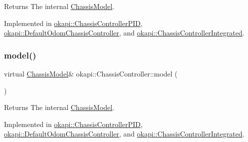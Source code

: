 \begin{DoxyReturn}{Returns}
The internal \mbox{\hyperlink{classokapi_1_1ChassisModel}{Chassis\+Model}}. 
\end{DoxyReturn}


Implemented in \mbox{\hyperlink{classokapi_1_1ChassisControllerPID_adffe6c9a65b6bd7664e0a884638d9097}{okapi\+::\+Chassis\+Controller\+P\+ID}}, \mbox{\hyperlink{classokapi_1_1DefaultOdomChassisController_a83e8bf7115086c331ada990ceb872bf1}{okapi\+::\+Default\+Odom\+Chassis\+Controller}}, and \mbox{\hyperlink{classokapi_1_1ChassisControllerIntegrated_a60c9a11616a2a41400c17952c36a5b57}{okapi\+::\+Chassis\+Controller\+Integrated}}.

\mbox{\label{classokapi_1_1ChassisController_a239802eda7e4317a65d1a04994f7b97e}} 
\subsubsection{\texorpdfstring{model()}{model()}}
{\footnotesize\ttfamily virtual \mbox{\hyperlink{classokapi_1_1ChassisModel}{Chassis\+Model}}\& okapi\+::\+Chassis\+Controller\+::model (\begin{DoxyParamCaption}{ }\end{DoxyParamCaption})\hspace{0.3cm}{\ttfamily [pure virtual]}}

\begin{DoxyReturn}{Returns}
The internal \mbox{\hyperlink{classokapi_1_1ChassisModel}{Chassis\+Model}}. 
\end{DoxyReturn}


Implemented in \mbox{\hyperlink{classokapi_1_1ChassisControllerPID_a225446cae7b569ff104d41d9aa2ae9b8}{okapi\+::\+Chassis\+Controller\+P\+ID}}, \mbox{\hyperlink{classokapi_1_1DefaultOdomChassisController_aa917086153b6298bf7792fd3b31ac240}{okapi\+::\+Default\+Odom\+Chassis\+Controller}}, and \mbox{\hyperlink{classokapi_1_1ChassisControllerIntegrated_a726fc6cd37748b860e56ddb586b5555a}{okapi\+::\+Chassis\+Controller\+Integrated}}.

\mbox{\label{classokapi_1_1ChassisController_a6d5b69139dfa8b814d05c74c22bcaa43}} 
